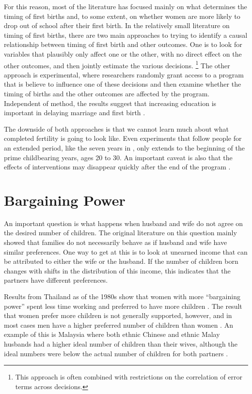 \documentclass[letterpaper,12pt]{article}
\begin{document}
For this reason, most of the literature has focused mainly on what
determines the timing of first births and, to some extent, on whether
women are more likely to drop out of school after their first birth.
In the relatively small literature on timing of first births, there are
two main approaches to trying to identify a causal relationship between
timing of first birth and other outcomes.
One is to look for variables that plausibly only affect one or the
other, with no direct effect on the other outcomes, and then jointly
estimate the various decisions.%
\footnote{
This approach is often combined with restrictions on the correlation of
error terms across decisions.
} 
The other approach is experimental, where researchers randomly grant 
access to a program that is believe to influence one of these decisions 
and then examine whether the timing of births and the other outcomes 
are affected by the program.
Independent of method, the results suggest that increasing education is
important in delaying marriage and first birth
\citep{Duflo2015,Marchetta2016}. 

The downside of both approaches is that we cannot learn much about what
completed fertility is going to look like.
Even experiments that follow people for an extended period, like the
seven years in \citet{Duflo2015}, only extends to the beginning of the
prime childbearing years, ages 20 to 30.
An important caveat is also that the effects of interventions may disappear 
quickly after the end of the program \citep{Baird2016}.



\section{Bargaining Power}

An important question is what happens when husband and wife do not agree
on the desired number of children.
The original literature on this question mainly showed that families do
not necessarily behave as if husband and wife have similar preferences.
One way to get at this is to look at unearned income that can be
attributed to either the wife or the husband.
If the number of children born changes with shifts in the distribution
of this income, this indicates that the partners have different
preferences.

Results from Thailand as of the 1980s show that women with more
``bargaining power'' spent less time working and preferred to have more
children \citep{Schultz1990}.
The result that women prefer more children is not generally supported,
however, and in most cases men have a higher preferred number of
children than women \citep{Westoff2010}.
An example of this is Malaysia where both ethnic Chinese and ethnic
Malay husbands had a higher ideal number of children than their wives,
although the ideal numbers were below the actual number of children for
both partners \citep{Rasul2008}.
\end{document}
